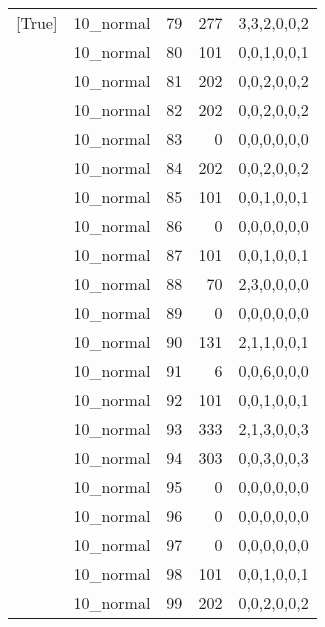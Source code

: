 \begin{tabular}{llrrl}
 [True]          & 10\_normal           &            79 &                   277 & 3,3,2,0,0,2   \\
 [True]          & 10\_normal           &            80 &                   101 & 0,0,1,0,0,1   \\
 [True]          & 10\_normal           &            81 &                   202 & 0,0,2,0,0,2   \\
 [True]          & 10\_normal           &            82 &                   202 & 0,0,2,0,0,2   \\
 [True]          & 10\_normal           &            83 &                     0 & 0,0,0,0,0,0   \\
 [True]          & 10\_normal           &            84 &                   202 & 0,0,2,0,0,2   \\
 [True]          & 10\_normal           &            85 &                   101 & 0,0,1,0,0,1   \\
 [True]          & 10\_normal           &            86 &                     0 & 0,0,0,0,0,0   \\
 [True]          & 10\_normal           &            87 &                   101 & 0,0,1,0,0,1   \\
 [True]          & 10\_normal           &            88 &                    70 & 2,3,0,0,0,0   \\
 [True]          & 10\_normal           &            89 &                     0 & 0,0,0,0,0,0   \\
 [True]          & 10\_normal           &            90 &                   131 & 2,1,1,0,0,1   \\
 [True]          & 10\_normal           &            91 &                     6 & 0,0,6,0,0,0   \\
 [True]          & 10\_normal           &            92 &                   101 & 0,0,1,0,0,1   \\
 [True]          & 10\_normal           &            93 &                   333 & 2,1,3,0,0,3   \\
 [True]          & 10\_normal           &            94 &                   303 & 0,0,3,0,0,3   \\
 [True]          & 10\_normal           &            95 &                     0 & 0,0,0,0,0,0   \\
 [True]          & 10\_normal           &            96 &                     0 & 0,0,0,0,0,0   \\
 [True]          & 10\_normal           &            97 &                     0 & 0,0,0,0,0,0   \\
 [True]          & 10\_normal           &            98 &                   101 & 0,0,1,0,0,1   \\
 [True]          & 10\_normal           &            99 &                   202 & 0,0,2,0,0,2   \\
\hline
\end{tabular}